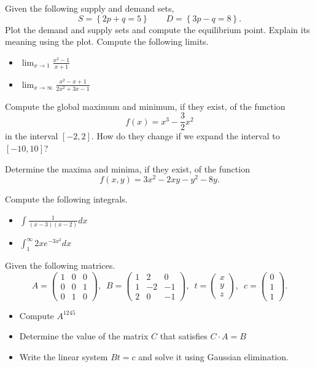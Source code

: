 \documentclass[12pt]{exam}
\begin{document}
\noindent
\begin{questions}

\question[1] Given the following supply and demand sets,
\[S=\left\lbrace 2p+q=5 \right\rbrace\qquad D=\left\lbrace 3p-q=8\right\rbrace.\]
Plot the demand and supply sets and compute the equilibrium point. Explain its meaning using the plot.
\question[2] Compute the following limits.
\begin{itemize}
    \item[i)] $\displaystyle\lim_{x\rightarrow 1}\frac{x^2-1}{x+1}$
    \item[ii)] $\displaystyle\lim_{x\rightarrow\infty}\frac{x^2-x+1}{2x^2+3x-1}$
\end{itemize}
\question[1] Compute the global maximum and minimum, if they exist, of the function $$f(x)=x^3-\frac{3}{2}x^2$$ in the interval $[-2,2]$. How do they change if we expand the interval to $[-10,10]$?

\question[1] Determine the maxima and minima, if they exist, of the function $$f(x,y)=3x^2-2xy-y^2-8y.$$

\question[2] Compute the following integrals.
\begin{itemize}
    \item[i)] $\displaystyle \int \frac{1}{(x-3)(x-2)} dx$
    \item[ii)] $\displaystyle \int_1^{\infty} 2xe^{-3x^2} dx$
\end{itemize}
\question[3] Given the following matrices.
\begin{equation*}
A=\begin{pmatrix}
1 & 0 & 0 \\
0 & 0 & 1 \\
0 & 1 & 0
\end{pmatrix},
\enspace
B=\begin{pmatrix}
1 & 2 & 0\\
1 & -2 & -1\\
2 & 0 & -1
\end{pmatrix},
\enspace
t=\begin{pmatrix}
x\\
y\\
z
\end{pmatrix},
\enspace
c=\begin{pmatrix}
0\\
1\\
1
\end{pmatrix}.
\end{equation*}
\begin{itemize}
    \item[i)] Compute $A^{1245}$
    \item[ii)] Determine the value of the matrix $C$ that satisfies $C\cdot A=B$
    \item[iii)] Write the linear system $Bt=c$ and solve it using Gaussian elimination.
\end{itemize}
\end{questions}	
\end{document}
